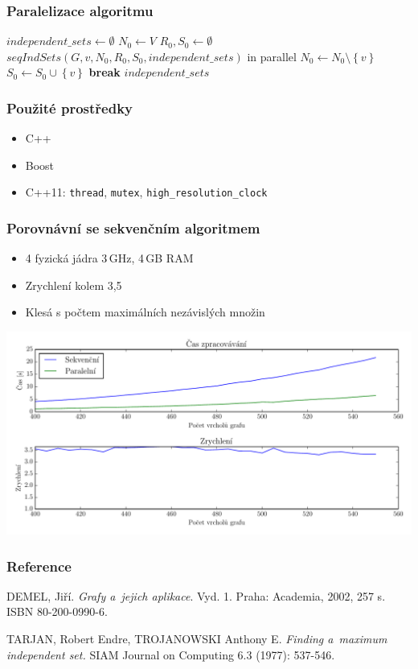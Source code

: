 \documentclass[table, czech]{beamer}
\newcommand{\setHelper}[1]{\left\lbrace #1 \right\rbrace}
\begin{document}
\frame
{
    \frametitle{Paralelizace algoritmu}
\begin{algorithmic}
\State $independent\_sets \leftarrow \emptyset$
\State $N_0 \leftarrow V$
\State $R_0, S_0 \leftarrow \emptyset$
    \State $seqIndSets(G, v, N_0, R_0, S_0, independent\_sets)$ in parallel
    \State $N_0 \leftarrow N_0 \setminus \setHelper{v}$
    \State $S_0 \leftarrow S_0 \cup \setHelper{v}$
        \State \textbf{break}
    \EndIf
\EndFor
\State \Return $independent\_sets$
\EndFunction
\end{algorithmic}

}

\frame
{
    \frametitle{Použité prostředky}
    \begin{itemize}
        \item C++
        \item Boost
        \item C++11: \texttt{thread}, \texttt{mutex}, \texttt{high\_resolution\_clock}
    \end{itemize}

}


\frame
{
    \frametitle{Porovnávní se sekvenčním algoritmem}
    \begin{itemize}
        \item 4 fyzická jádra 3\,GHz, 4\,GB RAM
        \item Zrychlení kolem 3,5
        \item Klesá s počtem maximálních nezávislých množin
    \end{itemize}

    \begin{center}
        \includegraphics[scale=0.43]{./images/7.pdf}
    \end{center}    
}


\frame
{
\frametitle{Reference}
\begin{thebibliography}{99}

    DEMEL, Jiří. \emph{Grafy a~jejich aplikace}. Vyd. 1. Praha: Academia, 2002, 257 s. ISBN 80-200-0990-6.

  TARJAN, Robert Endre, TROJANOWSKI Anthony E.
  \emph{Finding a~maximum independent set.}
  SIAM Journal on Computing 6.3 (1977): 537-546.

\end{thebibliography}
}
\end{document}
